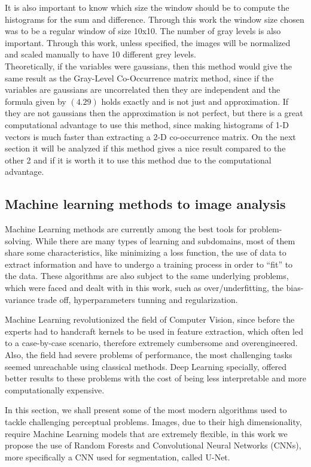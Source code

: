 It is also important to know which size the window should be to compute the histograms for the sum and difference. Through this work the window size chosen was to be a regular window of size 10x10.
The number of gray levels is also important. Through this work, unless specified, the images will be normalized and scaled manually to have 10 different grey levels.
\\
Theoretically, if the variables were gaussians, then this method would give the same result as the Gray-Level Co-Occurrence matrix method, since if the variables are gaussians are uncorrelated then they are independent and the formula given by $(4.29)$ holds exactly and is not just and approximation. If they are not gaussians then the approximation is not perfect, but there is a great computational advantage to use this method, since making histograms of 1-D vectors is much faster than extracting a 2-D co-occurrence matrix. On the next section it will be analyzed if this method gives a nice result compared to the other 2 and if it is worth it to use this method due to the computational advantage.


\subsection{Machine learning methods to image analysis}

Machine Learning methods are currently among the best tools for problem-solving. While there are many types of learning and subdomains, most of them share some characteristics, like minimizing a loss function, the use of data to extract information and have to undergo a training process in order to ``fit'' to the data. These algorithms are also subject to the same underlying problems, which were faced and dealt with in this work, such as over/underfitting, the bias-variance trade off, hyperparameters tunning and regularization.

Machine Learning revolutionized the field of Computer Vision, since before the experts had to handcraft kernels to be used in feature extraction, which often led to a case-by-case scenario, therefore  extremely cumbersome and overengineered. Also, the field had severe problems of performance, the most challenging tasks seemed unreachable using classical methods. Deep Learning specially, offered better results to these problems with the cost of being less interpretable and more computationally expensive. 

In this section, we shall present some of the most modern algorithms used to tackle challenging perceptual problems. Images, due to their high dimensionality, require Machine Learning models that are extremely flexible, in this work we propose the use of Random Forests and Convolutional Neural Networks (CNNs), more specifically a CNN used for segmentation, called U-Net.

